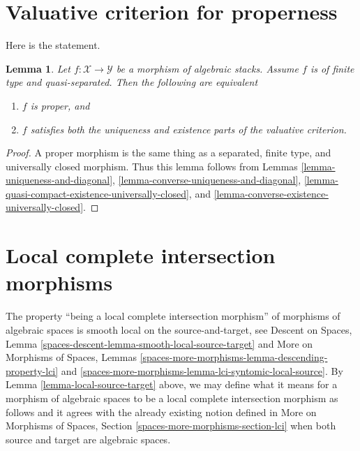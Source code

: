 \documentclass{stacks-project}
\theoremstyle{plain}
\newtheorem{lemma}[subsection]{Lemma}
\theoremstyle{definition}
\theoremstyle{remark}
\numberwithin{equation}{subsection}
\begin{document}
\section{Valuative criterion for properness}
\label{section-valutive-criterion-properness}

\noindent
Here is the statement.

\begin{lemma}
\label{lemma-criterion-proper}
Let $f : \mathcal{X} \to \mathcal{Y}$ be a morphism of algebraic stacks.
Assume $f$ is of finite type and quasi-separated.
Then the following are equivalent
\begin{enumerate}
\item $f$ is proper, and
\item $f$ satisfies both the uniqueness and existence parts
of the valuative criterion.
\end{enumerate}
\end{lemma}

\begin{proof}
A proper morphism is the same thing as a separated, finite type, and
universally closed morphism. Thus this lemma follows from Lemmas
\ref{lemma-uniqueness-and-diagonal},
\ref{lemma-converse-uniqueness-and-diagonal},
\ref{lemma-quasi-compact-existence-universally-closed}, and
\ref{lemma-converse-existence-universally-closed}.
\end{proof}







\section{Local complete intersection morphisms}
\label{section-lci}

\noindent
The property ``being a local complete intersection morphism''
of morphisms of algebraic spaces is
smooth local on the source-and-target, see
Descent on Spaces, Lemma \ref{spaces-descent-lemma-smooth-local-source-target}
and
More on Morphisms of Spaces, Lemmas
\ref{spaces-more-morphisms-lemma-descending-property-lci} and
\ref{spaces-more-morphisms-lemma-lci-syntomic-local-source}.
By Lemma \ref{lemma-local-source-target} above, we may define what it
means for a morphism of algebraic spaces to be
a local complete intersection morphism as follows and it agrees with the
already existing notion defined in
More on Morphisms of Spaces,
Section \ref{spaces-more-morphisms-section-lci}
when both source and target are algebraic spaces.
\end{document}
